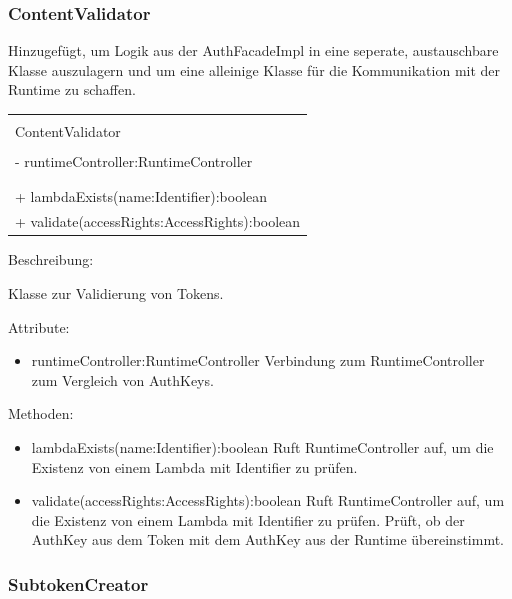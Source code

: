 \documentclass[a4paper,20pt,oneside]{book}
\begin{document}
	\subsubsection{ContentValidator}
		
	Hinzugefügt, um Logik aus der AuthFacadeImpl in eine seperate, austauschbare Klasse auszulagern und um eine alleinige Klasse für die Kommunikation	mit der Runtime zu schaffen.
	
	\vspace{0.5cm}
	\centering
	\begin{tabular}{|l|}
	\hline \\
	ContentValidator \\ \hline \\
	-  runtimeController:RuntimeController \\
	\\ \hline \\
   + lambdaExists(name:Identifier):boolean\\
   + validate(accessRights:AccessRights):boolean 
 \\ \hline
	\end{tabular}
		 
	\vspace{0.5cm}
	\raggedright
	Beschreibung:
	
	Klasse zur Validierung von Tokens.
	
	\vspace{0.5cm}
	Attribute:
	\begin{itemize}
	\item runtimeController:RuntimeController\linebreak
	Verbindung zum RuntimeController zum Vergleich von AuthKeys.
	\end{itemize}
	
	Methoden:
	\begin{itemize}
	\item lambdaExists(name:Identifier):boolean\linebreak
	Ruft RuntimeController auf, um die Existenz von einem Lambda mit Identifier zu prüfen.
	\item validate(accessRights:AccessRights):boolean \linebreak
	Ruft RuntimeController auf, um die Existenz von einem Lambda mit Identifier zu prüfen.
	Prüft, ob der AuthKey aus dem Token mit dem AuthKey aus der Runtime übereinstimmt.
	
	\end{itemize}
	
	
	\subsubsection{SubtokenCreator}
	
\end{document}
